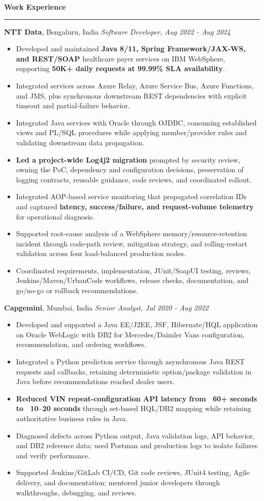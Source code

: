 \documentclass[11pt,letterpaper]{article}
\newcommand{\ressection}[1]{\Needspace{6\baselineskip}\vspace{8pt}\par\textbf{#1}\par\vspace{2pt}\hrule\vspace{5pt}}
\begin{document}
\ressection{Work Experience}
\textbf{NTT Data}, Bengaluru, India \hfill \textit{Software Developer, Aug 2022 - Aug 2024}
\begin{itemize}
  \item Developed and maintained \textbf{Java 8/11, Spring Framework/JAX-WS, and REST/SOAP} healthcare payer services on IBM WebSphere, supporting \textbf{50K+ daily requests at 99.99\% SLA availability}.
  \item Integrated services across Azure Relay, Azure Service Bus, Azure Functions, and JMS, plus synchronous downstream REST dependencies with explicit timeout and partial-failure behavior.
  \item Integrated Java services with Oracle through OJDBC, consuming established views and PL/SQL procedures while applying member/provider rules and validating downstream data propagation.
  \item \textbf{Led a project-wide Log4j2 migration} prompted by security review, owning the PoC, dependency and configuration decisions, preservation of logging contracts, reusable guidance, code reviews, and coordinated rollout.
  \item Integrated AOP-based service monitoring that propagated correlation IDs and captured \textbf{latency, success/failure, and request-volume telemetry} for operational diagnosis.
  \item Supported root-cause analysis of a WebSphere memory/resource-retention incident through code-path review, mitigation strategy, and rolling-restart validation across four load-balanced production nodes.
  \item Coordinated requirements, implementation, JUnit/SoapUI testing, reviews, Jenkins/Maven/UrbanCode workflows, release checks, documentation, and go/no-go or rollback recommendations.
\end{itemize}
\textbf{Capgemini}, Mumbai, India \hfill \textit{Senior Analyst, Jul 2020 - Aug 2022}
\begin{itemize}
  \item Developed and supported a Java EE/J2EE, JSF, Hibernate/HQL application on Oracle WebLogic with DB2 for Mercedes/Daimler Vans configuration, recommendation, and ordering workflows.
  \item Integrated a Python prediction service through asynchronous Java REST requests and callbacks, retaining deterministic option/package validation in Java before recommendations reached dealer users.
  \item \textbf{Reduced VIN repeat-configuration API latency from ~60+ seconds to ~10--20 seconds} through set-based HQL/DB2 mapping while retaining authoritative business rules in Java.
  \item Diagnosed defects across Python output, Java validation logs, API behavior, and DB2 reference data; used Postman and production logs to isolate failures and verify performance.
  \item Supported Jenkins/GitLab CI/CD, Git code reviews, JUnit4 testing, Agile delivery, and documentation; mentored junior developers through walkthroughs, debugging, and reviews.
\end{itemize}
\end{document}
